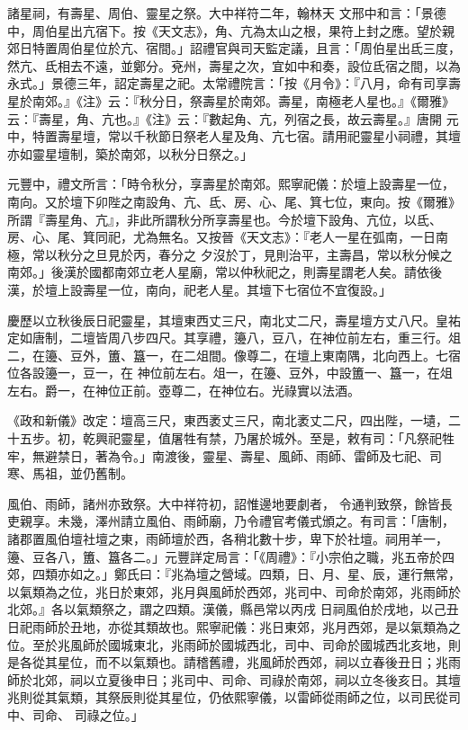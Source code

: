 \begin{pinyinscope}
 諸星祠，有壽星、周伯、靈星之祭。大中祥符二年，翰林天
 文邢中和言：「景德中，周伯星出亢宿下。按《天文志》，角、亢為太山之根，果符上封之應。望於親郊日特置周伯星位於亢、宿間。」詔禮官與司天監定議，且言：「周伯星出氐三度，然亢、氐相去不遠，並鄭分。兗州，壽星之次，宜如中和奏，設位氐宿之間，以為永式。」景德三年，詔定壽星之祀。太常禮院言：「按《月令》：『八月，命有司享壽星於南郊。』《注》云：『秋分日，祭壽星於南郊。壽星，南極老人星也。』《爾雅》云：『壽星，角、亢也。』《注》云：『數起角、亢，列宿之長，故云壽星。』唐開
 元中，特置壽星壇，常以千秋節日祭老人星及角、亢七宿。請用祀靈星小祠禮，其壇亦如靈星壇制，築於南郊，以秋分日祭之。」



 元豐中，禮文所言：「時令秋分，享壽星於南郊。熙寧祀儀：於壇上設壽星一位，南向。又於壇下卯陛之南設角、亢、氐、房、心、尾、箕七位，東向。按《爾雅》所謂『壽星角、亢』，非此所謂秋分所享壽星也。今於壇下設角、亢位，以氐、房、心、尾、箕同祀，尤為無名。又按晉《天文志》：『老人一星在弧南，一日南極，常以秋分之旦見於丙，春分之
 夕沒於丁，見則治平，主壽昌，常以秋分候之南郊。」後漢於國都南郊立老人星廟，常以仲秋祀之，則壽星謂老人矣。請依後漢，於壇上設壽星一位，南向，祀老人星。其壇下七宿位不宜復設。」



 慶歷以立秋後辰日祀靈星，其壇東西丈三尺，南北丈二尺，壽星壇方丈八尺。皇祐定如唐制，二壇皆周八步四尺。其享禮，籩八，豆八，在神位前左右，重三行。俎二，在籩、豆外，簠、簋一，在二俎間。像尊二，在壇上東南隅，北向西上。七宿位各設籩一，豆一，在
 神位前左右。俎一，在籩、豆外，中設簠一、簋一，在俎左右。爵一，在神位正前。壺尊二，在神位右。光祿實以法酒。



 《政和新儀》改定：壇高三尺，東西袤丈三尺，南北袤丈二尺，四出陛，一壝，二十五步。初，乾興祀靈星，值屠牲有禁，乃屠於城外。至是，敕有司：「凡祭祀牲牢，無避禁日，著為令。」南渡後，靈星、壽星、風師、雨師、雷師及七祀、司寒、馬祖，並仍舊制。



 風伯、雨師，諸州亦致祭。大中祥符初，詔惟邊地要劇者，
 令通判致祭，餘皆長吏親享。未幾，澤州請立風伯、雨師廟，乃令禮官考儀式頒之。有司言：「唐制，諸郡置風伯壇社壇之東，雨師壇於西，各稍北數十步，卑下於社壇。祠用羊一，籩、豆各八，簠、簋各二。」元豐詳定局言：「《周禮》：『小宗伯之職，兆五帝於四郊，四類亦如之。」鄭氏曰：『兆為壇之營域。四類，日、月、星、辰，運行無常，以氣類為之位，兆日於東郊，兆月與風師於西郊，兆司中、司命於南郊，兆雨師於北郊。』各以氣類祭之，謂之四類。漢儀，縣邑常以丙戌
 日祠風伯於戌地，以己丑日祀雨師於丑地，亦從其類故也。熙寧祀儀：兆日東郊，兆月西郊，是以氣類為之位。至於兆風師於國城東北，兆雨師於國城西北，司中、司命於國城西北亥地，則是各從其星位，而不以氣類也。請稽舊禮，兆風師於西郊，祠以立春後丑日；兆雨師於北郊，祠以立夏後申日；兆司中、司命、司祿於南郊，祠以立冬後亥日。其壇兆則從其氣類，其祭辰則從其星位，仍依熙寧儀，以雷師從雨師之位，以司民從司中、司命、
 司祿之位。」




\end{pinyinscope}
